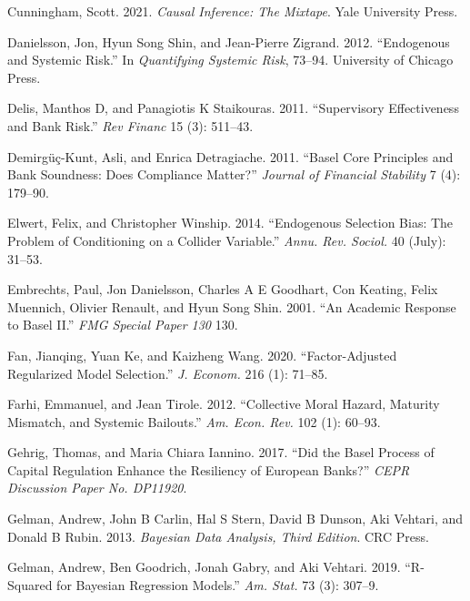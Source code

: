 \documentclass[
  10pt,
]{article}
\begin{document}
\leavevmode\hypertarget{ref-Cunningham2021}{}%
Cunningham, Scott. 2021. \emph{Causal Inference: The Mixtape}. Yale
University Press.

\leavevmode\hypertarget{ref-Danielsson2012}{}%
Danielsson, Jon, Hyun Song Shin, and Jean-Pierre Zigrand. 2012.
``Endogenous and Systemic Risk.'' In \emph{Quantifying Systemic Risk},
73--94. University of Chicago Press.

\leavevmode\hypertarget{ref-Delis2011}{}%
Delis, Manthos D, and Panagiotis K Staikouras. 2011. ``Supervisory
Effectiveness and Bank Risk.'' \emph{Rev Financ} 15 (3): 511--43.

\leavevmode\hypertarget{ref-Demirguc-Kunt2011}{}%
Demirgüç-Kunt, Asli, and Enrica Detragiache. 2011. ``Basel Core
Principles and Bank Soundness: Does Compliance Matter?'' \emph{Journal
of Financial Stability} 7 (4): 179--90.

\leavevmode\hypertarget{ref-Elwert2014}{}%
Elwert, Felix, and Christopher Winship. 2014. ``Endogenous Selection
Bias: The Problem of Conditioning on a Collider Variable.'' \emph{Annu.
Rev. Sociol.} 40 (July): 31--53.

\leavevmode\hypertarget{ref-Embrechts2001}{}%
Embrechts, Paul, Jon Danielsson, Charles A E Goodhart, Con Keating,
Felix Muennich, Olivier Renault, and Hyun Song Shin. 2001. ``An Academic
Response to Basel II.'' \emph{FMG Special Paper 130} 130.

\leavevmode\hypertarget{ref-Fan2020}{}%
Fan, Jianqing, Yuan Ke, and Kaizheng Wang. 2020. ``Factor-Adjusted
Regularized Model Selection.'' \emph{J. Econom.} 216 (1): 71--85.

\leavevmode\hypertarget{ref-Farhi2012}{}%
Farhi, Emmanuel, and Jean Tirole. 2012. ``Collective Moral Hazard,
Maturity Mismatch, and Systemic Bailouts.'' \emph{Am. Econ. Rev.} 102
(1): 60--93.

\leavevmode\hypertarget{ref-Gehrig2017}{}%
Gehrig, Thomas, and Maria Chiara Iannino. 2017. ``Did the Basel Process
of Capital Regulation Enhance the Resiliency of European Banks?''
\emph{CEPR Discussion Paper No. DP11920}.

\leavevmode\hypertarget{ref-Gelman2013}{}%
Gelman, Andrew, John B Carlin, Hal S Stern, David B Dunson, Aki Vehtari,
and Donald B Rubin. 2013. \emph{Bayesian Data Analysis, Third Edition}.
CRC Press.

\leavevmode\hypertarget{ref-Gelman2019}{}%
Gelman, Andrew, Ben Goodrich, Jonah Gabry, and Aki Vehtari. 2019.
``R-Squared for Bayesian Regression Models.'' \emph{Am. Stat.} 73 (3):
307--9.
\end{document}
